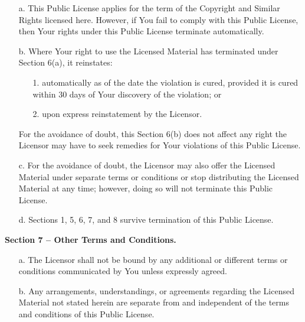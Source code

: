 \begin{itemize}
    \item[a.] This Public License applies for the term of the Copyright and Similar Rights licensed here. However, if You fail to comply with this Public License, then Your rights under this Public License terminate automatically.

    \item[b.] Where Your right to use the Licensed Material has terminated under Section 6(a), it reinstates:

    \begin{itemize}
        \item[1.] automatically as of the date the violation is cured, provided it is cured within 30 days of Your discovery of the violation; or

        \item[2.] upon express reinstatement by the Licensor.
    \end{itemize}

     For the avoidance of doubt, this Section 6(b) does not affect any right the Licensor may have to seek remedies for Your violations of this Public License.

    \item[c.] For the avoidance of doubt, the Licensor may also offer the Licensed Material under separate terms or conditions or stop distributing the Licensed Material at any time; however, doing so will not terminate this Public License.

    \item[d.] Sections 1, 5, 6, 7, and 8 survive termination of this Public License.
\end{itemize}

\begin{center}
    \textbf{Section 7 -- Other Terms and Conditions.}
\end{center}

\begin{itemize}
    \item[a.] The Licensor shall not be bound by any additional or different terms or conditions communicated by You unless expressly agreed.

    \item[b.] Any arrangements, understandings, or agreements regarding the Licensed Material not stated herein are separate from and independent of the terms and conditions of this Public License.
\end{itemize}

